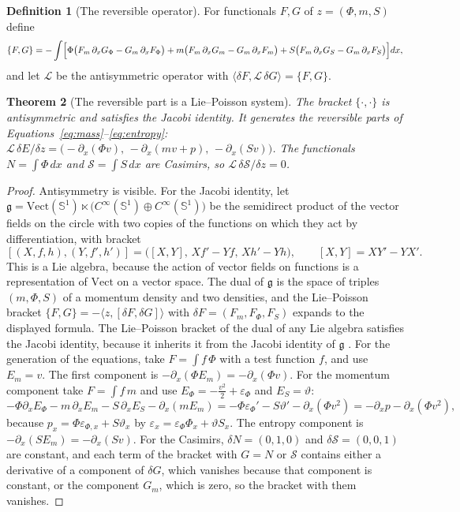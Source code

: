 \documentclass[11pt,oneside]{book}
\newtheorem{theorem}{Theorem}[chapter]
\theoremstyle{definition}
\newtheorem{definition}[theorem]{Definition}
\theoremstyle{remark}
\newcommand{\mathscr}[1]{\mathcal{#1}}
\begin{document}
\begin{definition}[The reversible operator]
For functionals $F,G$ of $z=(\Phi,m,S)$ define
\[
\{F,G\}=-\int\Bigl[\Phi\bigl(F_m\,\partial_xG_\Phi-G_m\,\partial_xF_\Phi\bigr)+m\bigl(F_m\,\partial_xG_m-G_m\,\partial_xF_m\bigr)+S\bigl(F_m\,\partial_xG_S-G_m\,\partial_xF_S\bigr)\Bigr]dx ,
\]
and let $\mathcal L$ be the antisymmetric operator with $\langle\delta F,\mathcal L\,\delta G\rangle=\{F,G\}$.
\end{definition}

\begin{theorem}[The reversible part is a Lie--Poisson system]\label{thm:LP}
The bracket $\{\cdot,\cdot\}$ is antisymmetric and satisfies the Jacobi identity. It generates the reversible parts of Equations~\eqref{eq:mass}--\eqref{eq:entropy}: $\mathcal L\,\delta E/\delta z=\bigl(-\partial_x(\Phi v),\,-\partial_x(mv+p),\,-\partial_x(Sv)\bigr)$. The functionals $N=\int\Phi\,dx$ and $\mathscr S=\int S\,dx$ are Casimirs, so $\mathcal L\,\delta\mathscr S/\delta z=0$.
\end{theorem}

\begin{proof}
Antisymmetry is visible. For the Jacobi identity, let $\mathfrak g=\mathrm{Vect}(\mathbb S^1)\ltimes\bigl(C^\infty(\mathbb S^1)\oplus C^\infty(\mathbb S^1)\bigr)$ be the semidirect product of the vector fields on the circle with two copies of the functions on which they act by differentiation, with bracket
\[
[(X,f,h),(Y,f',h')]=\bigl([X,Y],\,Xf'-Yf,\,Xh'-Yh\bigr),\qquad[X,Y]=XY'-YX'.
\]
This is a Lie algebra, because the action of vector fields on functions is a representation of $\mathrm{Vect}$ on a vector space. The dual of $\mathfrak g$ is the space of triples $(m,\Phi,S)$ of a momentum density and two densities, and the Lie--Poisson bracket $\{F,G\}=-\langle z,[\delta F,\delta G]\rangle$ with $\delta F=(F_m,F_\Phi,F_S)$ expands to the displayed formula. The Lie--Poisson bracket of the dual of any Lie algebra satisfies the Jacobi identity, because it inherits it from the Jacobi identity of $\mathfrak g$ \cite{holm1985,morrison1980}. For the generation of the equations, take $F=\int f\,\Phi$ with a test function $f$, and use $E_m=v$. The first component is $-\partial_x(\Phi E_m)=-\partial_x(\Phi v)$. For the momentum component take $F=\int f\,m$ and use $E_\Phi=-\tfrac{v^2}2+\varepsilon_\Phi$ and $E_S=\vartheta$:
\[
-\Phi\partial_xE_\Phi-m\,\partial_xE_m-S\,\partial_xE_S-\partial_x(mE_m)=-\Phi\varepsilon_\Phi'-S\vartheta'-\partial_x(\Phi v^2)=-\partial_x p-\partial_x(\Phi v^2),
\]
because $p_x=\Phi\varepsilon_{\Phi,x}+S\vartheta_x$ by $\varepsilon_x=\varepsilon_\Phi\Phi_x+\vartheta S_x$. The entropy component is $-\partial_x(SE_m)=-\partial_x(Sv)$. For the Casimirs, $\delta N=(0,1,0)$ and $\delta\mathscr S=(0,0,1)$ are constant, and each term of the bracket with $G=N$ or $\mathscr S$ contains either a derivative of a component of $\delta G$, which vanishes because that component is constant, or the component $G_m$, which is zero, so the bracket with them vanishes.
\end{proof}
\end{document}
